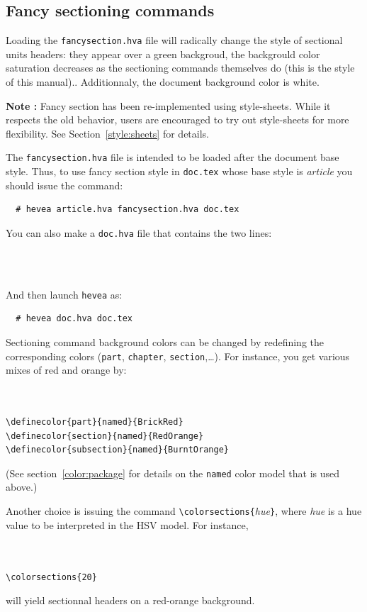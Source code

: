 \subsection{Fancy \label{fancysection}sectioning commands}
Loading the \texttt{fancysection.hva} file will radically change the
style of sectional units headers: they appear over a green
backgroud, the backgrould color saturation decreases as the sectioning
commands themselves do\ifhevea{} (this is the style of this manual).\else.\fi{}
Additionnaly, the document background color is white.

\textbf{Note : }Fancy section has been re-implemented using style-sheets. While it respects the old behavior, users are encouraged to try out style-sheets for more flexibility. See Section~\ref{style:sheets} for details.

The \texttt{fancysection.hva} file is intended to be loaded after
the document base style. Thus, to use fancy section style in
\texttt{doc.tex} whose base style is \textit{article}
you should issue the command:
\begin{verbatim}
  # hevea article.hva fancysection.hva doc.tex
\end{verbatim}
You can also make a \texttt{doc.hva} file that contains the two lines:
\begin{verbatim}
  
  
\end{verbatim}
And then launch \texttt{hevea} as:
\begin{verbatim}
  # hevea doc.hva doc.tex
\end{verbatim}

Sectioning command background colors can be changed by
redefining the corresponding colors (\texttt{part}, \texttt{chapter},
\texttt{section},\ldots).
For instance, you get various mixes of red and orange by:
\begin{verbatim}


\definecolor{part}{named}{BrickRed}
\definecolor{section}{named}{RedOrange}
\definecolor{subsection}{named}{BurntOrange}
\end{verbatim}
(See section~\ref{color:package} for details on the \texttt{named}
color model that is used above.)

Another choice is issuing the command
\verb+\colorsections{+\textit{hue}\verb+}+, where
\textit{hue} is a hue value to be interpreted in the HSV model.
For instance,
\begin{verbatim}


\colorsections{20}
\end{verbatim}
will yield sectionnal headers on a red-orange background.

